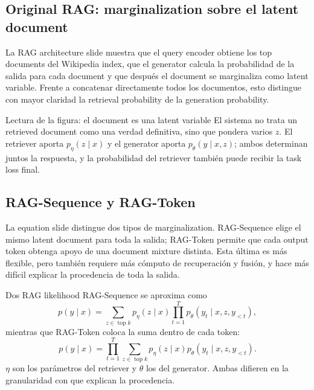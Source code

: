 \subsection{Original RAG: marginalization sobre el latent document}

La RAG architecture slide muestra que el query encoder obtiene los top documents del Wikipedia index, que el generator calcula la probabilidad de la salida para cada document y que después el document se marginaliza como latent variable. Frente a concatenar directamente todos los documentos, esto distingue con mayor claridad la retrieval probability de la generation probability.


\begin{knowledgebox}{Lectura de la figura: el document es una latent variable}
El sistema no trata un retrieved document como una verdad definitiva, sino que pondera varios $z$. El retriever aporta $p_\eta(z\mid x)$ y el generator aporta $p_\theta(y\mid x,z)$; ambos determinan juntos la respuesta, y la probabilidad del retriever también puede recibir la task loss final.
\end{knowledgebox}

\subsection{RAG-Sequence y RAG-Token}

La equation slide distingue dos tipos de marginalization. RAG-Sequence elige el mismo latent document para toda la salida; RAG-Token permite que cada output token obtenga apoyo de una document mixture distinta. Esta última es más flexible, pero también requiere más cómputo de recuperación y fusión, y hace más difícil explicar la procedencia de toda la salida.


\begin{importantbox}{Dos RAG likelihood}
RAG-Sequence se aproxima como
\[
p(y\mid x)=\sum_{z\in\operatorname{top}k}p_\eta(z\mid x)
\prod_{t=1}^{T}p_\theta(y_t\mid x,z,y_{<t}),
\]
mientras que RAG-Token coloca la suma dentro de cada token:
\[
p(y\mid x)=\prod_{t=1}^{T}\sum_{z\in\operatorname{top}k}
p_\eta(z\mid x)p_\theta(y_t\mid x,z,y_{<t}).
\]
$\eta$ son los parámetros del retriever y $\theta$ los del generator. Ambas difieren en la granularidad con que explican la procedencia.
\end{importantbox}

